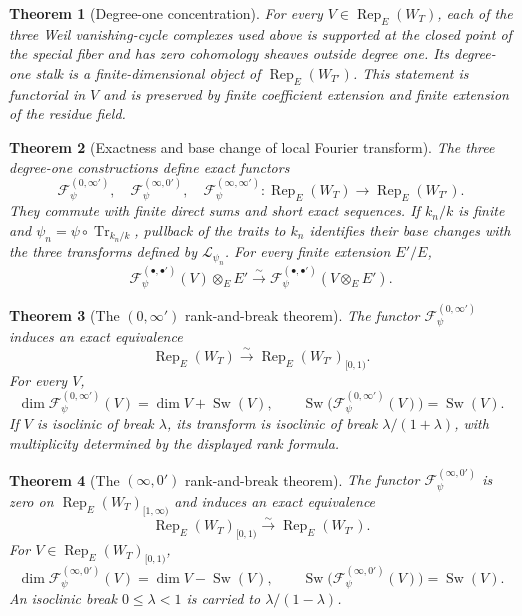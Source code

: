 \documentclass[10pt]{article}
\newtheorem{theorem}{Theorem}[section]
\theoremstyle{definition}
\newcommand{\Rep}{\operatorname{Rep}}
\newcommand{\Sw}{\operatorname{Sw}}
\begin{document}
\begin{theorem}[Degree-one concentration]
For every \(V\in\Rep_E(W_T)\), each of the three Weil vanishing-cycle complexes
used above is supported at the closed point of the special fiber and has
zero cohomology sheaves outside degree one.  Its degree-one stalk is a
finite-dimensional object of \(\Rep_E(W_{T'})\).  This statement
is functorial in \(V\) and is preserved by finite coefficient extension and
finite extension of the residue field.
\end{theorem}

\begin{theorem}[Exactness and base change of local Fourier transform]
The three degree-one constructions define exact functors
\[
 \mathcal F_\psi^{(0,\infty')},\quad
 \mathcal F_\psi^{(\infty,0')},\quad
 \mathcal F_\psi^{(\infty,\infty')}:
 \Rep_E(W_T)\longrightarrow\Rep_E(W_{T'}).
\]
They commute with finite direct sums and short exact sequences.  If
\(k_n/k\) is finite and
\(\psi_n=\psi\circ\operatorname{Tr}_{k_n/k}\), pullback of the traits to
\(k_n\) identifies their base changes with the three transforms defined by
\(\mathcal L_{\psi_n}\).  For every finite extension \(E'/E\),
\[
 \mathcal F_\psi^{(\bullet,\bullet')}(V)\otimes_EE'
 \xrightarrow{\sim}
 \mathcal F_\psi^{(\bullet,\bullet')}(V\otimes_EE').
\]
\end{theorem}

\begin{theorem}[The \((0,\infty')\) rank-and-break theorem]
The functor \(\mathcal F_\psi^{(0,\infty')}\) induces an exact equivalence
\[
 \Rep_E(W_T)\xrightarrow{\sim}\Rep_E(W_{T'})_{[0,1)}.
\]
For every \(V\),
\[
 \dim\mathcal F_\psi^{(0,\infty')}(V)=\dim V+\Sw(V),
 \qquad
 \Sw\bigl(\mathcal F_\psi^{(0,\infty')}(V)\bigr)=\Sw(V).
\]
If \(V\) is isoclinic of break \(\lambda\), its transform is isoclinic of
break \(\lambda/(1+\lambda)\), with multiplicity determined by the
displayed rank formula.
\end{theorem}

\begin{theorem}[The \((\infty,0')\) rank-and-break theorem]
The functor \(\mathcal F_\psi^{(\infty,0')}\) is zero on
\(\Rep_E(W_T)_{[1,\infty)}\) and induces an exact equivalence
\[
 \Rep_E(W_T)_{[0,1)}\xrightarrow{\sim}\Rep_E(W_{T'}).
\]
For \(V\in\Rep_E(W_T)_{[0,1)}\),
\[
 \dim\mathcal F_\psi^{(\infty,0')}(V)=\dim V-\Sw(V),
 \qquad
 \Sw\bigl(\mathcal F_\psi^{(\infty,0')}(V)\bigr)=\Sw(V).
\]
An isoclinic break \(0\le\lambda<1\) is carried to
\(\lambda/(1-\lambda)\).
\end{theorem}
\end{document}
